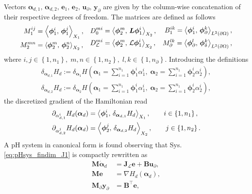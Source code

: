 Vectors $\bm{\alpha}_{d, 1},\, \bm{\alpha}_{d, 2}, \, \mathbf{e}_{1}, \, \mathbf{e}_{2}, \, \mathbf{u}_\partial, \, \mathbf{y}_\partial$ are given by the column-wise concatenation of their respective degrees of freedom. The matrices are defined as follows 
\begin{equation}
\begin{aligned}
M_1^{ij} &= \inner[X_1]{\bm\phi_1^i}{\bm\phi_1^j}, \\
M_2^{mn} &= \inner[X_2]{\bm\phi_2^m}{\bm\phi_2^n}, \\
\end{aligned}\quad
\begin{aligned}
{D}_{0}^{mi} &= \inner[X_2]{\bm\phi_2^m}{\bm{L}\bm\phi_1^i}, \\
{D}_{\mathcal{L}}^{mi} &= \inner[X_2]{\bm\phi_2^m}{\mathcal{L}\bm\phi_1^i}, 
\end{aligned}\quad  
\begin{aligned}
{B}_{1}^{ik} = \inner[L^2(\partial \Omega)]{\bm\phi_1^i}{\bm\phi_\partial^k}, \\
M_\partial^{lk} = \inner[L^2(\partial \Omega)]{\bm\phi_\partial^l}{\bm\phi_\delta^k},
\end{aligned}
\end{equation}
where $i, j \in \left\{1, n_1\right\}, \; m,n \in \left\{1, n_2\right\}, \; l, k \in \left\{1, n_\partial \right\}$. Introducing the definitions
\begin{align*}
	\delta_{\bm{\alpha}_{d, 1}} H_d := \delta_{\bm{\alpha}_{1}} H\left(\bm{\alpha}_1 = \sum_{i=1}^{n_1} \bm{\phi}_1^i \alpha_1^i, \;  \bm{\alpha}_2 = \sum_{i=1}^{n_1} \bm{\phi}_2^i \alpha_2^i\right), \\
	\delta_{\bm{\alpha}_{d, 2}} H_d := \delta_{\bm{\alpha}_{2}} H\left(\bm{\alpha}_1 = \sum_{i=1}^{n_1} \bm{\phi}_1^i \alpha_1^i, \;  \bm{\alpha}_2 = \sum_{i=1}^{n_1} \bm{\phi}_2^i \alpha_2^i\right),
\end{align*}
the discretized gradient of the Hamiltonian read
\begin{equation}
\begin{aligned}
\partial_{{\alpha}_{d, 1}^i} H_d(\bm{\alpha}_d) &= \inner[X_1]{\bm\phi_1^i}{\delta_{\bm{\alpha}_{d, 1}} H_d}, \qquad i \in \left\{1, n_1\right\}, \\
\partial_{{\alpha}_{d, 2}^j} H_d(\bm{\alpha}_d) &= \inner[X_2]{\bm\phi_2^j}{\delta_{\bm{\alpha}_{d, 2}} H_d}, \qquad j \in \left\{1, n_2\right\}.
\end{aligned}
\end{equation}
A pH system in canonical form is found observing that Sys. \eqref{eq:pHsys_findim_J1} is compactly rewritten as 
\begin{align}
\mathbf{M} \dot{\bm{\alpha}}_{d} &= \mathbf{J}_{\mathcal{L}} \mathbf{e} + \mathbf{B}\mathbf{u}_\partial, \label{eq:pH_findim_dyn1} \\
\mathbf{M} \mathbf{e} &= \nabla H_d(\bm{\alpha}_d), \label{eq:pH_findin_e}\\
\mathbf{M}_\partial {\mathbf{y}_\partial} &= \mathbf{B}^\top \mathbf{e},
\end{align}

